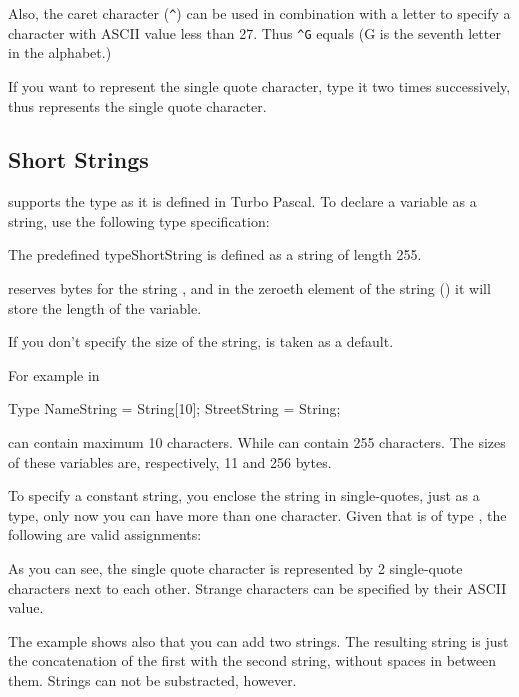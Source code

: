 \documentclass{report}
\begin{document}
Also, the caret character (\verb+^+) can be used in combination with a letter to
specify a character with ASCII value less than 27. Thus \verb+^G+ equals
 (G is the seventh letter in the alphabet.)

If you want to represent the single quote character, type it two times
successively, thus  represents the single quote character.

\subsection{Short Strings}
\fpc supports the  type as it is defined in Turbo Pascal.
To declare a variable as a string, use the following type specification:



The predefined type{ShortString} is defined as a string of length 255.

\fpc reserves  bytes for the string , and in the zeroeth
element of the string () it will store the length of the variable.

If you don't specify the size of the string,  is taken as a
default.

For example in 
\begin{listing}
Type
   NameString = String[10];
   StreetString = String;
\end{listing}
 can contain maximum 10 characters. While 
 can contain 255 characters. The sizes of these variables
are, respectively, 11 and 256 bytes.
 
To specify a constant string, you enclose the string in single-quotes, just
as a  type, only now you can have more than one character.
Given that  is of type , the following are valid assignments: 
As you can see, the single quote character is represented by 2 single-quote
characters next to each other. Strange characters can be specified by their
ASCII value.

The example shows also that you can add two strings. The resulting string is
just the concatenation of the first with the second string, without spaces in
between them. Strings can not be substracted, however.
\end{document}
